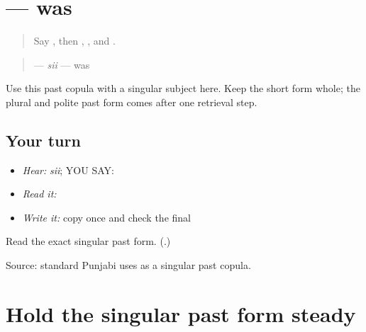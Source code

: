 \section[\texorpdfstring{\pa{ਸੀ} (sii)}{ਸੀ (sii)}]{ — was}

\label{lesson:PA-C187-si}



\begin{quote}
Say \textbf{}, then \textbf{}, \textbf{}, and \textbf{}.
\end{quote}

\begin{grammarlens}[title={Grammar Lens: the singular past form}]
\begin{quote}
\textbf{} — \emph{sii} — was
\end{quote}

Use this past copula with a singular subject here. Keep the short form whole; the plural and polite past form comes after one retrieval step.
\end{grammarlens}

\subsection*{Your turn}
\begin{itemize}
\raggedright
  \item \emph{Hear:} \emph{sii}; YOU SAY: \textbf{}
  \item \emph{Read it:} \textbf{   }
  \item \emph{Write it:} copy \textbf{} once and check the final \textbf{}
\end{itemize}

\begin{tcolorbox}[breakable,colback=teal!4,colframe=teal!35!black,title={Before you move on}]
Read the exact singular past form. (\textbf{}.)

Source: standard Punjabi uses \textbf{} as a singular past copula.
\end{tcolorbox}
\section[\texorpdfstring{\pa{ਅਮਨ} \pa{ਘਰ} \pa{ਵਿੱਚ} \pa{ਸੀ} (Aman ghar vich sii)}{ਅਮਨ ਘਰ ਵਿੱਚ ਸੀ (Aman ghar vich sii)}]{Hold the singular past form steady}

\label{lesson:PA-C187-si-review}



